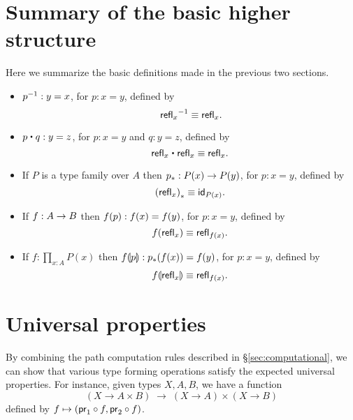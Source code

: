 \section{Summary of the basic higher structure}
\label{sec:basics-summary}

Here we summarize the basic definitions made in the previous two sections.

\begin{itemize}
\item $\opp{p} : y=x$, for $p:x=y$, defined by
  \[\opp{\;\refl{x}}\jdeq \refl{x}.\]
\item $p\ct q :y=z$, for $p:x=y$ and $q:y=z$, defined by
  \[ \refl{x}\ct\refl{x}\jdeq\refl{x}.\]
\item If $P$ is a type family over $A$ then $\transf{p}:P(x)\ra P(y)$, for $p:x=y$, defined by
  \[\transf{(\refl{x})}\jdeq \idfunc[P(x)].\]
\item If $f:A\ra B$ then $\map{f}{p}:f(x)=f(y)$, for $p:x=y$, defined by
  \[\map{f}{\refl{x}}\jdeq \refl{f(x)}.\]
\item If $f:\prod_{x:A}P(x)$ then $\mapdep{f}{p}:\trans{p}{f(x)}=f(y)$, for $p:x=y$, defined by
  \[\mapdep{f}{\refl{x}}\jdeq \refl{f(x)}.\]
\end{itemize}







\section{Universal properties}
\label{sec:universal-properties}

By combining the path computation rules described in \S\ref{sec:computational}, we can show that various type forming operations satisfy the expected universal properties.
For instance, given types $X,A,B$, we have a function
\begin{equation}
  (X\to A\times B) \;\to \; (X\to A)\times (X\to B)\label{eq:prod-ump-map}
\end{equation}
defined by $f \mapsto (\proj1 \circ f, \proj2\circ f)$.

